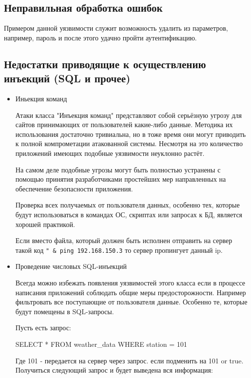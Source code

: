 \documentclass{article}
\begin{document}
\subsection{Неправильная обработка ошибок}

Примером данной уязвимости служит возможность удалить из параметров, например, пароль и после этого удачно пройти аутентификацию.



\subsection{Недостатки приводящие к осуществлению инъекций (SQL и прочее)}

\begin{itemize}
	
	\item Иньекция команд
	
	Атаки класса "Инъекция команд" представляют собой серьёзную угрозу для сайтов принимающих
	от пользователей какие-либо данные. Методика их использования достаточно тривиальна, но в тоже
	время они могут приводить к полной компрометации атакованной системы. Несмотря на это количество
	приложений имеющих подобные уязвимости неуклонно растёт.
	
	На самом деле подобные угрозы могут быть полностью устранены с помощью принятия разработчиками
	простейших мер направленных на обеспечение безопасности приложения.
	
	Проверка всех получаемых от пользователя данных, особенно тех, которые будут использоваться
	в командах ОС, скриптах или запросах к БД, является хорошей практикой.
	
	Если вместо файла, который должен быть исполнен отправить на сервер такой код \verb'" & ping 192.168.150.3' то сервер пропингует данный ip.
	
	\item Проведение числовых SQL-инъекций
	
	Всегда можно избежать появления уязвимостей этого класса
	если в процессе написания приложений соблюдать общие меры предосторожности.
	Например фильтровать все поступающие от пользователя данные. Особенно те, которые
	будут помещены в SQL-запросы. 
	
	Пусть есть запрос:
	
	SELECT * FROM weather\_data WHERE station = 101
	
	Где 101 - передается на сервер через запрос. если подменить на 101 or true. Получиться следующий запрос и будет выведена вся информация:
	

\end{itemize}
\end{document}
